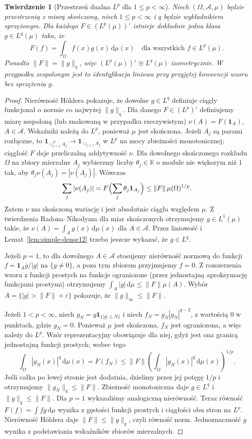 \documentclass[11pt,a4paper]{article}
\numberwithin{equation}{section}
\theoremstyle{plain}
\newtheorem{twierdzenie}{Twierdzenie}[section]
\theoremstyle{definition}
\theoremstyle{remark}
\newcommand{\K}{\mathbb K}
\begin{document}
\begin{twierdzenie}[Przestrzeń dualna $L^p$ dla $1\le p<\infty$]
\label{thm:lp-dual12}
Niech $(\Omega,\mathcal A,\mu)$ będzie przestrzenią z miarą
skończoną, niech $1\le p<\infty$ i $q$ będzie wykładnikiem
sprzężonym. Dla każdego $F\in(L^p(\mu))'$ istnieje dokładnie
jedna klasa $g\in L^q(\mu)$ taka, że
\[
 F(f)=\int_\Omega f(x)g(x)\,\mathrm d\mu(x)
 \quad\text{dla wszystkich }f\in L^p(\mu).
\]
Ponadto $\|F\|=\|g\|_q$, więc
$(L^p(\mu))'\cong L^q(\mu)$ izometrycznie. W przypadku
zespolonym jest to identyfikacja liniowa przy przyjętej konwencji
wzoru bez sprzężenia $g$.
\end{twierdzenie}
\begin{proof}
Nierówność H\"oldera pokazuje, że dowolne $g\in L^q$
definiuje ciągły funkcjonał o normie co najwyżej $\|g\|_q$.
Dla danego $F\in(L^p)'$ definiujemy miarę zespoloną
(lub znakowaną w przypadku rzeczywistym)
$\nu(A)=F(\mathbf1_A)$, $A\in\mathcal A$.
Wskaźniki należą do $L^p$, ponieważ $\mu$ jest skończona.
Jeżeli $A_j$ są parami rozłączne, to
$\mathbf1_{\cup_{j=1}^NA_j}\to\mathbf1_{\cup_{j\ge1}A_j}$
w $L^p$ na mocy zbieżności monotonicznej; ciągłość $F$
daje przeliczalną addytywność $\nu$.
Dla dowolnego skończonego rozkładu $\Omega$ na zbiory
mierzalne $A_j$ wybierzmy liczby $\theta_j\in\K$ o module
nie większym niż $1$ tak, aby
$\theta_j\nu(A_j)=|\nu(A_j)|$. Wówczas
\[
 \sum_j|\nu(A_j)|
 =F\Bigl(\sum_j\theta_j\mathbf1_{A_j}\Bigr)
 \le\|F\|\,\mu(\Omega)^{1/p}.
\]
Zatem $\nu$ ma skończoną wariację i jest absolutnie ciągła
względem $\mu$. Z twierdzenia Radona--Nikodyma dla miar
skończonych otrzymujemy $g\in L^1(\mu)$ takie, że
$\nu(A)=\int_Ag(x)\,\mathrm d\mu(x)$ dla $A\in\mathcal A$.
Przez liniowość i Lemat~\ref{lem:simple-dense12} trzeba jeszcze
wykazać, że $g\in L^q$.

Jeżeli $p=1$, to dla dowolnego $A\in\mathcal A$ stosujemy
nierówność normową do funkcji
$f=\mathbf1_A\overline g/|g|$ na $\{g\ne0\}$,
a poza tym zbiorem przyjmujemy $f=0$. Z rozszerzenia wzoru
z funkcji prostych na funkcje ograniczone (przez jednostajną
aproksymację funkcjami prostymi) otrzymujemy
$\int_A|g|\,\mathrm d\mu\le\|F\|\mu(A)$.
Wybór $A=\{|g|>\|F\|+\varepsilon\}$ pokazuje,
że $\|g\|_\infty\le\|F\|$.

Jeżeli $1<p<\infty$, niech
$g_N=g\mathbf1_{\{|g|\le N\}}$ i niech
$f_N=\overline{g_N}|g_N|^{q-2}$, z wartością $0$ w
punktach, gdzie $g_N=0$. Ponieważ $\mu$ jest skończona,
$f_N$ jest ograniczona, a więc należy do $L^p$.
Wzór reprezentacyjny obowiązuje dla niej, gdyż
jest ona granicą jednostajną funkcji prostych; wobec tego
\[
 \int_\Omega|g_N(x)|^q\,\mathrm d\mu(x)
 =F(f_N)\le\|F\|\left(\int_\Omega|g_N(x)|^q\,\mathrm d\mu(x)\right)^{1/p}.
\]
Jeśli całka po lewej stronie jest dodatnia, dzielimy przez
jej potęgę $1/p$ i otrzymujemy $\|g_N\|_q\le\|F\|$.
Zbieżność monotoniczna daje $g\in L^q$ i $\|g\|_q\le\|F\|$.
Dla $p=1$ wykazaliśmy analogiczną nierówność.
Teraz równość $F(f)=\int fg\,\mathrm d\mu$ wynika z gęstości
funkcji prostych i ciągłości obu stron na $L^p$.
Nierówność H\"oldera daje $\|F\|\le\|g\|_q$, czyli
równość norm. Jednoznaczność $g$ wynika z podstawiania
wskaźników zbiorów mierzalnych.
\end{proof}
\end{document}
